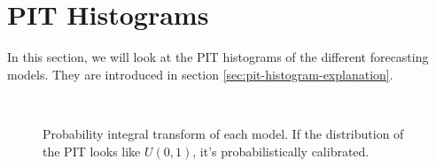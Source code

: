 \section{PIT Histograms}

In this section, we will look at the PIT histograms of the different forecasting models. They are introduced in section \ref{sec:pit-histogram-explanation}.

\begin{figure}[h]%
    \centering
     \\
    \caption[PIT histograms]{Probability integral transform of each model. 
    If the distribution of the PIT looks like \(U(0,1)\), it's probabilistically calibrated.}%
    \label{fig:pit}%
\end{figure}


